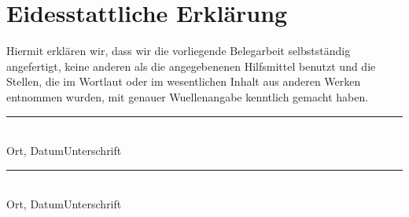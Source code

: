 \chapter*{Eidesstattliche Erklärung}
Hiermit erklären wir, dass wir die vorliegende Belegarbeit selbstständig angefertigt,
 keine anderen als die angegebenenen Hilfsmittel benutzt und die Stellen, 
 die im Wortlaut oder im wesentlichen Inhalt aus anderen Werken entnommen wurden,
 mit genauer Wuellenangabe kenntlich gemacht haben.

  \vspace{5\baselineskip}
  \noindent
  \rule[0.5ex]{25em}{0.5pt}\\
  Ort, Datum\qquad\qquad Unterschrift

  \vspace{5\baselineskip}
  \noindent
  \rule[0.5ex]{25em}{0.5pt}\\
  Ort, Datum\qquad\qquad Unterschrift
